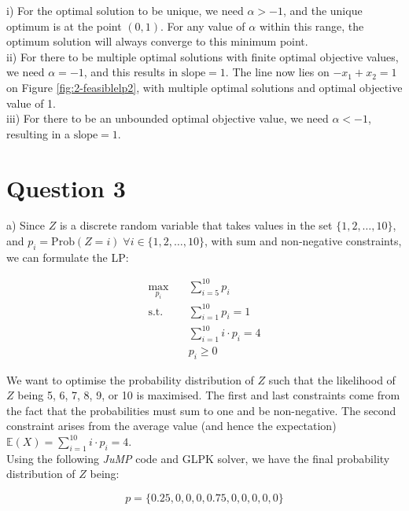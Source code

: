 \documentclass[12pt]{article}
\begin{document}
\noindent i) For the optimal solution to be unique, we need $\alpha > -1$, and the unique optimum is at the point $(0,1)$. For any value of $\alpha$ within this range, the optimum solution will always converge to this minimum point. \\ 

\noindent ii) For there to be multiple optimal solutions with finite optimal objective values, we need $\alpha = -1$, and this results in $ \text{slope} = 1$. The line now lies on $-x_1 + x_2 = 1$ on Figure \ref{fig:2-feasiblelp2}, with multiple optimal solutions and optimal objective value of 1. \\ 

\noindent iii) For there to be an unbounded optimal objective value, we need $\alpha < -1$, resulting in a $\text{slope} = 1$. 

\newpage 

\section*{Question 3}
a) Since $Z$ is a discrete random variable that takes values in the set $\{1, 2, \dots, 10\}$, and $p_i = \text{Prob}(Z = i) \; \forall i \in \{1, 2, \dots , 10\}$, with sum and non-negative constraints, we can formulate the LP: 

\begin{align*}
    \max_{p_i} \quad & \sum_{i=5}^{10} p_i \\ 
    \text{s.t.} \quad & \sum_{i=1}^{10} p_i = 1 \\ 
    & \sum_{i=1}^{10} i \cdot p_i = 4 \\ 
    & p_i \geq 0
\end{align*} 

\noindent We want to optimise the probability distribution of $Z$ such that the likelihood of $Z$ being 5, 6, 7, 8, 9, or 10 is maximised. The first and last constraints come from the fact that the probabilities must sum to one and be non-negative. The second constraint arises from the average value (and hence the expectation) $\mathbb{E}(X) = \sum_{i=1}^{10} i \cdot p_i = 4$. \\ 

\noindent Using the following \textit{JuMP} code and GLPK solver, we have the final probability distribution of $Z$ being: 

\begin{equation*}
    \boxed{p = \{0.25, 0, 0, 0, 0.75, 0, 0, 0, 0, 0\}}
\end{equation*}
\end{document}
